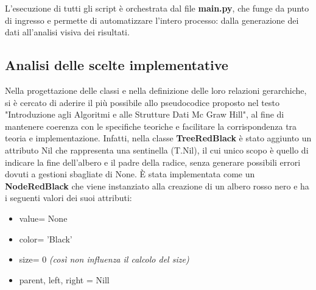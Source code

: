 \documentclass[10pt]{article}
\begin{document}
L’esecuzione di tutti gli script è orchestrata dal file \textbf{main.py}, che funge da punto di ingresso e permette di automatizzare l’intero processo: dalla generazione dei dati all’analisi visiva dei risultati.
\newpage
\subsection{Analisi delle scelte implementative}
Nella progettazione delle classi e nella definizione delle loro relazioni gerarchiche, si è cercato di aderire il più possibile allo pseudocodice proposto nel testo "Introduzione agli Algoritmi e alle Strutture Dati Mc Graw Hill", al fine di mantenere coerenza con le specifiche teoriche e facilitare la corrispondenza tra teoria e implementazione. Infatti, nella classe \textbf{TreeRedBlack} è stato aggiunto un attributo Nil che rappresenta una sentinella (T.Nil), il cui unico scopo è quello di indicare la fine dell'albero e il padre della radice, senza generare possibili errori dovuti a gestioni sbagliate di None.
\newline
\noindent \`E stata implementata come un \textbf{NodeRedBlack} che viene instanziato alla creazione di un albero rosso nero e ha i seguenti valori dei suoi attributi:
\begin{itemize}
    \item value= None
    \item color= 'Black'
    \item size= 0 \textit{(così non influenza il calcolo del size)}
    \item parent, left, right = Nill
\end{itemize}
\end{document}
